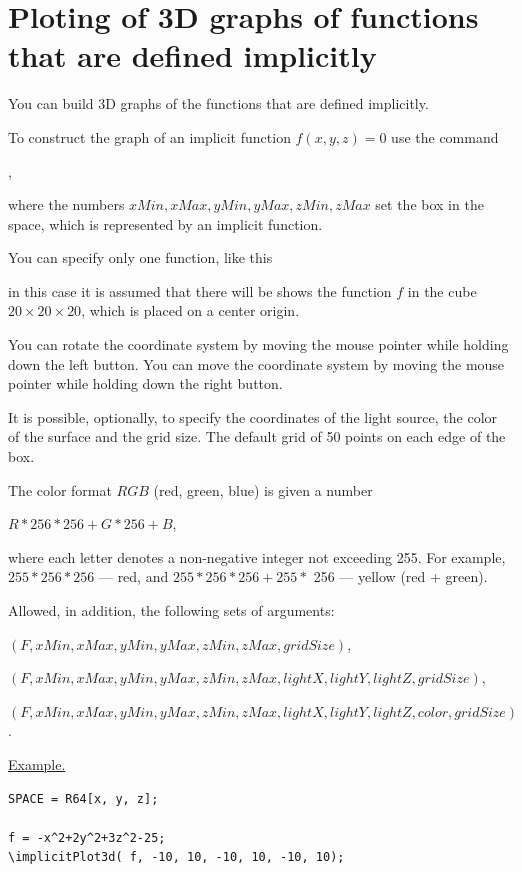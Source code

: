 \section{Ploting of 3D graphs of functions that are defined implicitly} 
You can build 3D graphs of the functions that are defined implicitly. 
 
To construct the graph of an implicit function $ f(x,y,z)=0$ use the command 

 , 

where the numbers $xMin, xMax, yMin, yMax, zMin, zMax$  set the box in the space, 
which is represented by an implicit function. 

You can specify only one function, like this


in this case it is assumed that there will be shows the function $ f $ in the cube 
$ 20\times 20 \times 20$,
 which is placed on a center origin.

You can rotate the coordinate system by moving the mouse pointer while holding down the left button.
You can move the coordinate system by moving the mouse pointer while holding down the right button.

It is possible, optionally, to specify the coordinates of the light source, the color of the surface and the grid size. The default grid of 50 points on each edge of the box.

The color format $RGB$ (red, green, blue) is given a number

$R * 256 * 256+ G *256 + B$,

 where each letter denotes a non-negative integer not exceeding 255.
For example, $ 255 * 256 * 256 $ --- red, and $ 255 * 256 * 256 + 255 * $ 256 --- yellow (red + green).

Allowed, in addition, the following sets of arguments:

$(F, xMin, xMax, yMin, yMax, zMin, zMax, gridSize)$,

$(F, xMin, xMax, yMin, yMax, zMin, zMax, lightX, lightY, lightZ, gridSize)$,

$(F, xMin, xMax, yMin, yMax, zMin, zMax, lightX, lightY, lightZ, color, gridSize)$.

\underline{Example. }

\vspace*{-2mm}


\begin{verbatim}
SPACE = R64[x, y, z];
 
f = -x^2+2y^2+3z^2-25;
\implicitPlot3d( f, -10, 10, -10, 10, -10, 10);
\end{verbatim}

